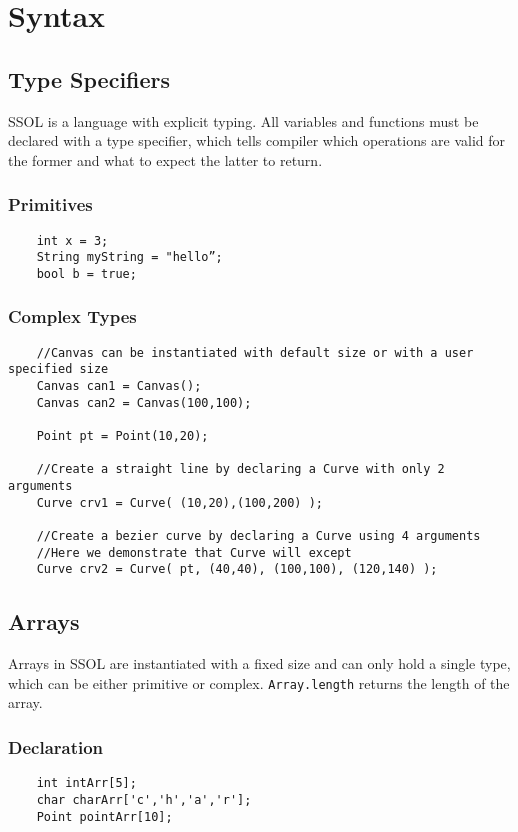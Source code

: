 \documentclass{article}
\begin{document}
\section{Syntax}
\subsection{Type Specifiers}
SSOL is a language with explicit typing. All variables and functions must be declared with a type specifier, which tells compiler which operations are valid for the former and what to expect the latter to return. 
\subsubsection{Primitives}
\begin{verbatim}
    int x = 3;
    String myString = "hello”;
    bool b = true;
\end{verbatim}

\subsubsection{Complex Types}
\begin{verbatim}
    //Canvas can be instantiated with default size or with a user specified size
    Canvas can1 = Canvas();
    Canvas can2 = Canvas(100,100);
    
    Point pt = Point(10,20);
    
    //Create a straight line by declaring a Curve with only 2 arguments
    Curve crv1 = Curve( (10,20),(100,200) );
    
    //Create a bezier curve by declaring a Curve using 4 arguments
    //Here we demonstrate that Curve will except 
    Curve crv2 = Curve( pt, (40,40), (100,100), (120,140) );
\end{verbatim}

\subsection{Arrays}
Arrays in SSOL are instantiated with a fixed size and can only hold a single type, which can be either primitive or complex. \texttt{Array.length} returns the length of the array.
\subsubsection{Declaration}
\begin{verbatim}
    int intArr[5];
    char charArr['c','h','a','r'];
    Point pointArr[10];
\end{verbatim}
\end{document}
